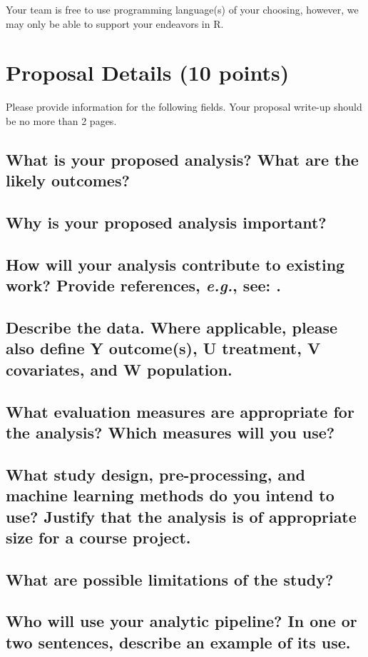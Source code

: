 \documentclass[twoside,11pt]{article}
\begin{document}
Your team is free to use programming language(s) of your choosing, however, we may only be able to support your endeavors in R.

\section{Proposal Details (10 points)} \label{details}
Please provide information for the following fields. Your proposal write-up should be no more than 2 pages.

\subsection{What is your proposed analysis? What are the likely outcomes?}


\subsection{Why is your proposed analysis important?}

\subsection{How will your analysis contribute to existing work? Provide references, \emph{e.g.}, see: \cite{cite1}.}

\subsection{Describe the data. Where applicable, please also define Y outcome(s), U treatment, V covariates, and W population.}


\subsection{What evaluation measures are appropriate for the analysis? Which measures will you use?}


\subsection{What study design, pre-processing, and machine learning methods do you intend to use? Justify that the analysis is of appropriate size for a course project.}

\subsection{What are possible limitations of the study?}

\subsection{Who will use your analytic pipeline? In one or two sentences, describe an example of its use.}


\end{document}

